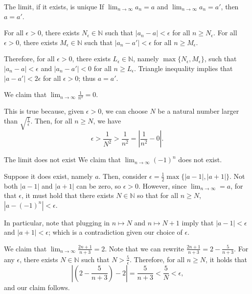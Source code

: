 \begin{prop}{The limit, if it exists, is unique}{}
	If  \(\lim_{n\to\infty} a_n = a\) and  \(\lim_{n\to\infty} a_n = a'\), then \(a = a'\).
\end{prop}

\begin{dem}{}{}
	For all \(\epsilon > 0\), there exists \(N_\epsilon \in \mathbb{N}\) such that \(|a_n - a|<\epsilon\) for all  \(n \geq N_\epsilon\).
	For all \(\epsilon > 0\), there exists \(M_\epsilon \in \mathbb{N}\) such that \(|a_n - a'|<\epsilon\) for all  \(n \geq M_\epsilon\).

	Therefore, for all \(\epsilon > 0\), there exists \(L_\epsilon \in \mathbb{N}\), namely \(\max\{N_\epsilon, M_\epsilon\}\), such that  \(|a_n - a| < \epsilon\) and  \(|a_n - a'| < 0\) for all  \(n \geq L_\epsilon\). Triangle inequality implies that \(|a - a'| < 2\epsilon\) for all \(\epsilon > 0\); thus \(a = a'\).
\end{dem}

\begin{exmp}{}{}
	We claim that \(\lim_{n\to\infty} \frac{1}{n^2} = 0\).

	This is true because, given \(\epsilon > 0\), we can choose \(N\) be a natural number larger than \(\sqrt{\frac{1}{\epsilon}}\). Then, for all \(n \geq N\), we have \[
		\epsilon > \frac{1}{N^2} > \frac{1}{n^2} = \left|\frac{1}{n^2} - 0\right|.
	\]
\end{exmp}

\begin{exmp}{The limit does not exist}{}
	We claim that \(\lim_{n\to\infty} (-1)^n\) does not exist.  

	Suppose it does exist, namely \(a\). Then, consider \(\epsilon = \frac{1}{2} \max\{|a - 1|, |a + 1|\}\). Not both \(|a - 1|\) and  \(|a + 1|\) can be zero, so  \(\epsilon > 0\). However, since \(\lim_{n\to\infty} = a\), for that \(\epsilon\), it must hold that there exists \(N \in \mathbb{N}\) so that for all \(n \geq N\), \(|a - (-1)^n| < \epsilon\).

	In particular, note that plugging in \(n \mapsto N\) and \(n\mapsto N+1\) imply that \(|a - 1| < \epsilon\) and \(|a + 1| < \epsilon\); which is a contradiction given our choice of \(\epsilon\).
\end{exmp}

\begin{exmp}{}{}
	We claim that \(\lim_{n\to\infty} \frac{2n+1}{n+3} = 2\). 
	Note that we can rewrite \(\frac{2n+1}{n+3} = 2 - \frac{5}{n+3}\). For any \(\epsilon\), there exists \(N \in \mathbb{N}\) such that \(N > \frac{5}{\epsilon}\). Therefore, for all \(n \geq N\), it holds that \[
		\left|\left(2 - \frac{5}{n+3}\right) - 2\right| = \frac{5}{n+3} < \frac{5}{N} < \epsilon\text{,}
	\]
	and our claim follows.
\end{exmp}
